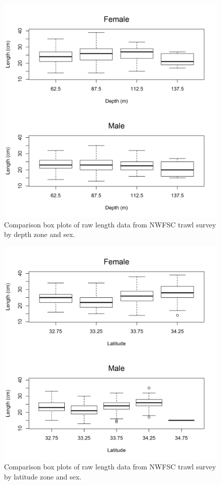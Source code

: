\documentclass[12pt,]{article}
\begin{document}
\begin{figure}[htbp]
\centering
\includegraphics{Figures/NWFSCtrawl_lengthdepth.png}
\caption{Comparison box plots of raw length data from NWFSC trawl survey
by depth zone and sex. \label{fig:Fleet8_NWFSCtrawl_lengthdepth}}
\end{figure}

\begin{figure}[htbp]
\centering
\includegraphics{Figures/NWFSCtrawl_lengthlat.png}
\caption{Comparison box plots of raw length data from NWFSC trawl survey
by latitude zone and sex. \label{fig:Fleet8_NWFSCtrawl_lengthlat}}
\end{figure}
\end{document}
